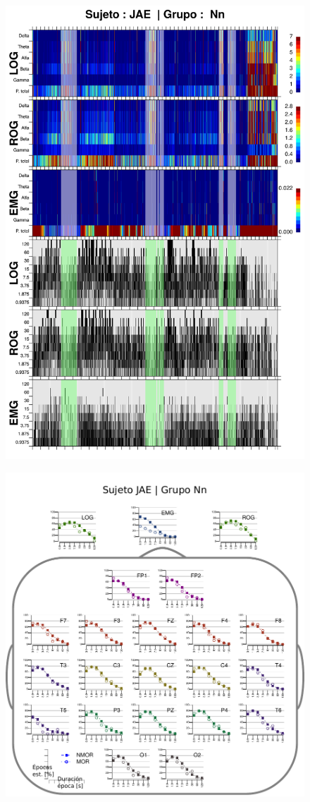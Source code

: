 \begin{figure}
\centering
\includegraphics[width=0.9\linewidth]
{./img_resultados/JANASUE_combinado_.png} 
\end{figure}

\begin{figure}
\centering
\includegraphics[width=.9\linewidth]{./img_resultados/cabeza_JAE.pdf}
\end{figure}

